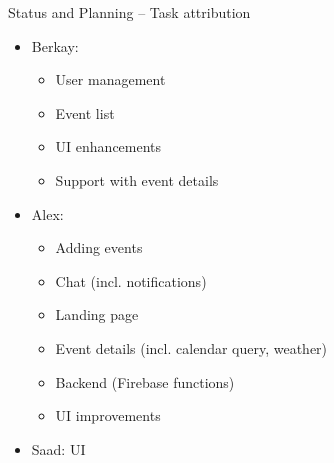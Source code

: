 \documentclass[logo=EURECOM,english]{eurecombeamer}
\begin{document}
\begin{frame}{Status and Planning -- Task attribution}
\begin{itemize}
\item Berkay:
	\begin{itemize}
	\item User management
	\item Event list
	\item UI enhancements
	\item Support with event details
	\end{itemize}
\item Alex:
	\begin{itemize}
	\item Adding events
	\item Chat (incl. notifications)
	\item Landing page
	\item Event details (incl. calendar query, weather)
	\item Backend (Firebase functions)
	\item UI improvements
	\end{itemize}
\item Saad: UI
\end{itemize}
\end{frame}

\begin{frame}
\end{frame}

\begin{frame}
\end{frame}
\end{document}

